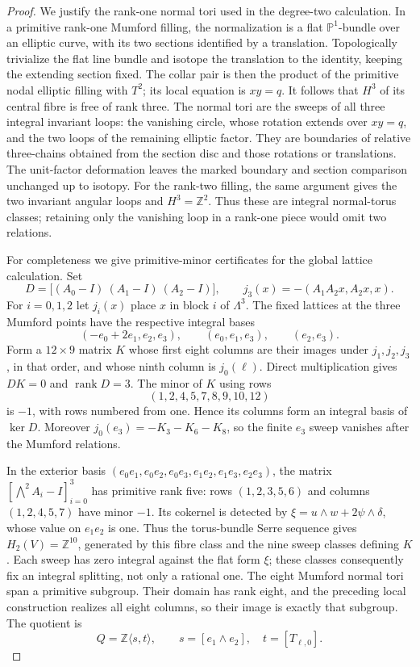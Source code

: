 \begin{proof}
We justify the rank-one normal tori used in the degree-two
calculation. In a primitive rank-one Mumford filling, the
normalization is a flat $\mathbb P^1$-bundle over an elliptic
curve, with its two sections identified by a translation.
Topologically trivialize the flat line bundle and isotope the
translation to the identity, keeping the extending section fixed.
The collar pair is then the product of the primitive nodal
elliptic filling with $T^2$; its local equation is $xy=q$.
It follows that $H^3$ of its central fibre is free of rank three.
The normal tori are the sweeps of all three integral invariant
loops: the vanishing circle, whose rotation extends over $xy=q$,
and the two loops of the remaining elliptic factor. They are
boundaries of relative three-chains obtained from the section
disc and those rotations or translations. The unit-factor
deformation leaves the marked boundary and section comparison
unchanged up to isotopy. For the rank-two filling, the same
argument gives the two invariant angular loops and $H^3=\mathbb Z^2$.
Thus these are integral normal-torus classes; retaining only the
vanishing loop in a rank-one piece would omit two relations.

For completeness we give primitive-minor certificates for the
global lattice calculation. Set
\[
 D=\bigl[(A_0-I)\ (A_1-I)\ (A_2-I)\bigr],
 \qquad
 j_3(x)=-(A_1A_2x,A_2x,x).
\]
For $i=0,1,2$ let $j_i(x)$ place $x$ in block $i$ of
$\Lambda^3$. The fixed lattices at the three Mumford points have
the respective integral bases
\[
 (-e_0+2e_1,e_2,e_3),\qquad (e_0,e_1,e_3),\qquad(e_2,e_3).
\]
Form a $12\times9$ matrix $K$ whose first eight columns are
their images under $j_1,j_2,j_3$, in that order, and whose ninth
column is $j_0(\ell)$. Direct multiplication gives $DK=0$ and
$\operatorname{rank}D=3$. The minor of $K$ using rows
\[
 (1,2,4,5,7,8,9,10,12)
\]
is $-1$, with rows numbered from one. Hence its columns form
an integral basis of $\ker D$. Moreover
$j_0(e_3)=-K_3-K_6-K_8$, so the finite $e_3$ sweep vanishes
after the Mumford relations.

In the exterior basis
$(e_0e_1,e_0e_2,e_0e_3,e_1e_2,e_1e_3,e_2e_3)$,
the matrix $[\bigwedge^2A_i-I]_{i=0}^3$ has primitive rank five:
rows $(1,2,3,5,6)$ and columns $(1,2,4,5,7)$ have minor $-1$.
Its cokernel is detected by
$\xi=u\wedge w+2\psi\wedge\delta$, whose value on $e_1e_2$
is one. Thus the torus-bundle Serre sequence gives
$H_2(V)=\mathbb Z^{10}$, generated by this fibre class and
the nine sweep classes defining $K$. Each sweep has zero
integral against the flat form $\xi$; these classes consequently
fix an integral splitting, not only a rational one.
The eight Mumford normal tori span a primitive subgroup.
Their domain has rank eight, and the preceding local construction
realizes all eight columns, so their image is exactly that subgroup.
The quotient is
\[
 Q=\mathbb Z\langle s,t\rangle,
 \qquad s=[e_1\wedge e_2],\quad t=[T_{\ell,0}].
\]


\end{proof}

